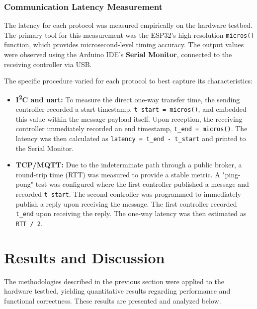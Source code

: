 \subsubsection{Communication Latency Measurement}
\label{subsubsec:latency_methodology}

The latency for each protocol was measured empirically on the hardware testbed. The primary tool for this measurement was the ESP32's high-resolution \texttt{micros()} function, which provides microsecond-level timing accuracy. The output values were observed using the Arduino IDE's \textbf{Serial Monitor}, connected to the receiving controller via USB.

The specific procedure varied for each protocol to best capture its characteristics:
\begin{itemize}
    \item \textbf{I\textsuperscript{2}C and \gls{uart}:} To measure the direct one-way transfer time, the sending controller recorded a start timestamp, \texttt{t\_start = micros()}, and embedded this value within the message payload itself. Upon reception, the receiving controller immediately recorded an end timestamp, \texttt{t\_end = micros()}. The latency was then calculated as \texttt{latency = t\_end - t\_start} and printed to the Serial Monitor.

    \item \textbf{TCP/MQTT:} Due to the indeterminate path through a public broker, a round-trip time (RTT) was measured to provide a stable metric. A "ping-pong" test was configured where the first controller published a message and recorded \texttt{t\_start}. The second controller was programmed to immediately publish a reply upon receiving the message. The first controller recorded \texttt{t\_end} upon receiving the reply. The one-way latency was then estimated as \texttt{RTT / 2}.
\end{itemize}

\section{Results and Discussion}
\label{sec:results_and_discussion}

The methodologies described in the previous section were applied to the hardware testbed, yielding quantitative results regarding performance and functional correctness. These results are presented and analyzed below.

